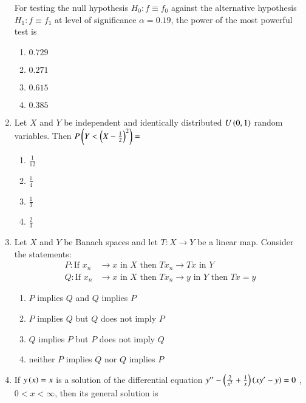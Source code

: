 \documentclass[journal,onecolumn]{IEEEtran}
\theoremstyle{remark}
\begin{document}
\begin{enumerate}
	For testing the null hypothesis $H_0 \colon f \equiv f_0$ against the alternative hypothesis $H_1\colon f \equiv f_1$ at level of significance $\alpha = 0.19$, the power of the most powerful test is

	\hfill{}
	\begin{enumerate}
		\item $0.729$ 
		\item $0.271$ 
		\item $0.615$ 
		\item $0.385$ 
	\end{enumerate}


    \item Let $X$ and $Y$ be independent and identically distributed $U\left(0,1\right)$ random variables. Then $P\left(Y < \left(X - \frac{1}{2}\right)^2\right) = $
	\hfill{}

	\begin{enumerate}
		\item $\frac{1}{12}$
		\item $\frac{1}{4}$
		\item $\frac{1}{3}$
		\item $\frac{2}{3}$
	\end{enumerate}


    \item Let $X$ and $Y$ be Banach spaces and let $T\colon X \to Y$ be a linear map. Consider the statements:
	\begin{align*}
		P\colon \text{If } x_n &\to x \text{ in } X \text{ then } Tx_n \to Tx \text{ in } Y\\
		Q\colon \text{If } x_n &\to x \text{ in } X \text{ then } Tx_n \to y \text{ in } Y \text{ then } Tx = y
	\end{align*}

	\hfill{}
	\begin{enumerate}
		\item $P$ implies $Q$ and $Q$ implies $P$
		\item $P$ implies $Q$ but $Q$ does not imply $P$
		\item $Q$ implies $P$ but $P$ does not imply $Q$
		\item neither $P$ implies $Q$ nor $Q$ implies $P$
	\end{enumerate}


    \item If $y\left(x\right) = x$ is a solution of the differential equation $y^{\prime\prime} - \left(\frac{2}{x^2}+\frac{1}{x}\right)\left(xy^{\prime} - y\right) = 0$ , $0<x<\infty$, then its general solution is
	\hfill{}


\end{enumerate}
\end{document}
